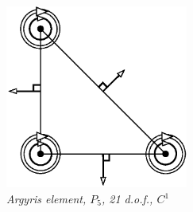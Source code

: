 \documentclass[10pt,a4paper]{article}
\begin{document}
\begin{figure}[H]
  \begin{center}
    \includegraphics[width=6cm,angle=0]{getfemlist_argyris.eps}
  \end{center}
  \caption{ \it Argyris element, $P_5$, 21 d.o.f., $C^1$}
  \label{fig:argyris}
\end{figure}
\end{document}
